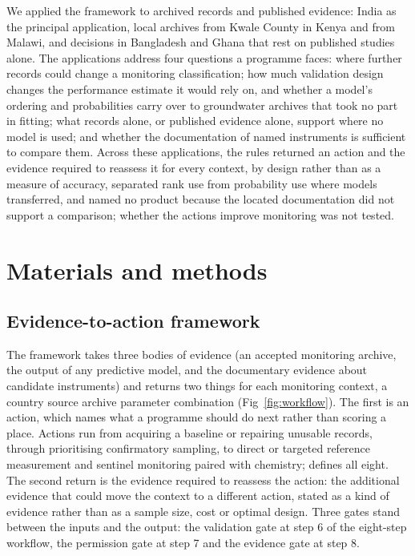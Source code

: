 \documentclass[10pt,letterpaper]{article}
\begin{document}
We applied the framework to archived records and published evidence: India as the principal application, local archives from Kwale County in Kenya and from Malawi, and decisions in Bangladesh and Ghana that rest on published studies alone. The applications address four questions a programme faces: where further records could change a monitoring classification; how much validation design changes the performance estimate it would rely on, and whether a model's ordering and probabilities carry over to groundwater archives that took no part in fitting; what records alone, or published evidence alone, support where no model is used; and whether the documentation of named instruments is sufficient to compare them. Across these applications, the rules returned an action and the evidence required to reassess it for every context, by design rather than as a measure of accuracy, separated rank use from probability use where models transferred, and named no product because the located documentation did not support a comparison; whether the actions improve monitoring was not tested.

\FloatBarrier

\section*{Materials and methods}

\subsection*{Evidence-to-action framework}

The framework takes three bodies of evidence (an accepted monitoring archive, the output of any predictive model, and the documentary evidence about candidate instruments) and returns two things for each monitoring context, a country \texttimes{} source archive \texttimes{} parameter combination (Fig~\ref{fig:workflow}). The first is an action, which names what a programme should do next rather than scoring a place. Actions run from acquiring a baseline or repairing unusable records, through prioritising confirmatory sampling, to direct or targeted reference measurement and sentinel monitoring paired with chemistry;  defines all eight. The second return is the evidence required to reassess the action: the additional evidence that could move the context to a different action, stated as a kind of evidence rather than as a sample size, cost or optimal design. Three gates stand between the inputs and the output: the validation gate at step 6 of the eight-step workflow, the permission gate at step 7 and the evidence gate at step 8.\label{callout:fig:workflow}
\end{document}
